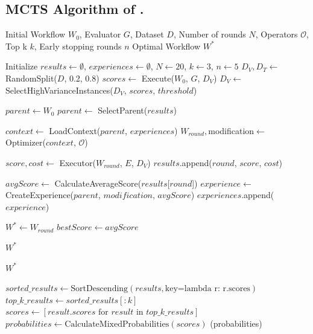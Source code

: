 \subsection{MCTS Algorithm of \model.}
\label{appendix:algorithmaflow}
\vspace{-10mm}
\begin{algorithm}
\caption{Detailed Explanation of the \model Algorithm}
\begin{algorithmic}[1]
\Require Initial Workflow $W_0$, Evaluator $G$, Dataset $D$, Number of rounds $N$, Operators $\mathcal{O}$, Top k $k$, Early stopping rounds $n$
\Ensure Optimal Workflow $W^*$

\State Initialize $results \gets \emptyset$, $experiences \gets \emptyset$, $N \gets 20$, $k \gets 3$, $n \gets 5$
\State $D_V, D_T \gets$ RandomSplit($D$, 0.2, 0.8)  
\State $scores \gets$ Execute($W_0$, $G$, $D_V$)
\State $D_V \gets$ SelectHighVarianceInstances($D_V$, $scores$, $threshold$)  

        \State $parent \gets W_0$
    \Else
        \State $parent \gets$ SelectParent($results$)
    \EndIf
    
    \State $context \gets$ LoadContext($parent$, $experiences$)
    \State $W_{round}, $modification$ \gets$ Optimizer($context$, $\mathcal{O}$)
    
        \State $score, cost \gets$ Executor($W_{round}$, $E$, $D_V$)
        \State $results$.append($round$, $score$, $cost$)
    \EndFor
    
    \State $avgScore \gets$ CalculateAverageScore($results$[$round$])
    \State $experience \gets$ CreateExperience($parent$, $modification$, $avgScore$)
    \State $experiences$.append($experience$)
    
        \State $W^* \gets W_{round}$
        \State $bestScore \gets avgScore$
    \EndIf
      
    
        \Return $W^*$
    \EndIf
\EndFor

\State \Return $W^*$

    \State $sorted\_results \gets \text{SortDescending}(results, \text{key=lambda r: r.scores})$
    \State $top\_k\_results \gets sorted\_results[:k]$
    \State $scores \gets [result.scores \text{ for } result \text{ in } top\_k\_results]$
    \State $probabilities \gets \text{CalculateMixedProbabilities}(scores)$
    \State \Return {}(probabilities)
\EndProcedure


\end{algorithmic}
\end{algorithm}
